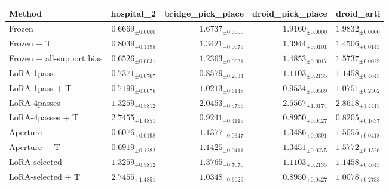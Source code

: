 \begin{tabular}{lrrrr}
\toprule
Method & hospital\_2 & bridge\_pick\_place & droid\_pick\_place & droid\_arti \\
\midrule
Frozen & $0.6669_{\pm 0.0000}$ & $1.6737_{\pm 0.0000}$ & $1.9160_{\pm 0.0000}$ & $1.9832_{\pm 0.0000}$ \\
Frozen + T & $0.8039_{\pm 0.1198}$ & $1.3421_{\pm 0.0079}$ & $1.3944_{\pm 0.0101}$ & $1.4506_{\pm 0.0143}$ \\
Frozen + all-support bias & $0.6526_{\pm 0.0031}$ & $1.2363_{\pm 0.0031}$ & $1.4853_{\pm 0.0017}$ & $1.5737_{\pm 0.0029}$ \\
LoRA-1pass & $0.7371_{\pm 0.0767}$ & $0.8579_{\pm 0.2034}$ & $1.1103_{\pm 0.2135}$ & $1.1458_{\pm 0.4645}$ \\
LoRA-1pass + T & $0.7199_{\pm 0.0078}$ & $1.0213_{\pm 0.6148}$ & $0.9534_{\pm 0.0569}$ & $1.0751_{\pm 0.2302}$ \\
LoRA-4passes & $1.3259_{\pm 0.5812}$ & $2.0453_{\pm 0.5766}$ & $2.5567_{\pm 1.6174}$ & $2.8618_{\pm 1.4415}$ \\
LoRA-4passes + T & $2.7455_{\pm 1.4851}$ & $0.9241_{\pm 0.4119}$ & $0.8950_{\pm 0.0427}$ & $0.8205_{\pm 0.1637}$ \\
Aperture & $0.6076_{\pm 0.0198}$ & $1.1377_{\pm 0.0347}$ & $1.3486_{\pm 0.0391}$ & $1.5055_{\pm 0.0418}$ \\
Aperture + T & $0.6919_{\pm 0.1282}$ & $1.1425_{\pm 0.0411}$ & $1.3451_{\pm 0.0275}$ & $1.5772_{\pm 0.1526}$ \\
LoRA-selected & $1.3259_{\pm 0.5812}$ & $1.3765_{\pm 0.7070}$ & $1.1103_{\pm 0.2135}$ & $1.1458_{\pm 0.4645}$ \\
LoRA-selected + T & $2.7455_{\pm 1.4851}$ & $1.0348_{\pm 0.6029}$ & $0.8950_{\pm 0.0427}$ & $1.0078_{\pm 0.2733}$ \\
\bottomrule
\end{tabular}

